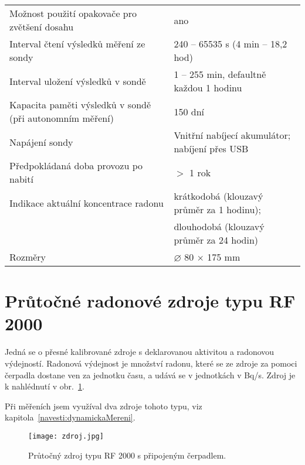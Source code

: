\begin{table}[H]
\begin{tabular}{p{}p{}}
Možnost použití opakovače pro zvětšení dosahu            & ano                                                                       \\
Interval čtení výsledků měření ze sondy                  & 240 – 65535 s (4 min – 18,2 hod)                                          \\
Interval uložení výsledků v sondě                        & 1 – 255 min, defaultně každou 1 hodinu                                    \\
Kapacita paměti výsledků v sondě (při autonomním měření) & 150 dní                                                                   \\
Napájení sondy                                           & Vnitřní nabíjecí akumulátor; nabíjení přes USB                            \\
Předpokládaná doba provozu po nabití                     & $>$ 1 rok                                                        \\
Indikace aktuální koncentrace radonu                     & krátkodobá (klouzavý průměr za 1 hodinu);                                  \\
                                                         & dlouhodobá (klouzavý průměr za 24 hodin)                                  \\
Rozměry                                                  & $\diameter$ 80 $\times$ 175 mm                                                   \\
\bottomrule
\end{tabular}
\end{table}
\section{Průtočné radonové zdroje typu RF 2000}\label{navesti:radon_zdroje}
Jedná se o přesné kalibrované zdroje s deklarovanou aktivitou  a radonovou výdejností. Radonová výdejnost je množství radonu, které se ze zdroje za pomoci čerpadla dostane ven za jednotku času, a udává se v jednotkách v \si{Bq/s}. Zdroj je k nahlédnutí v obr.~\ref{fig:radon_zdroj}.

Při měřeních jsem využíval dva zdroje tohoto typu, viz kapitola~\ref{navesti:dynamickaMereni}.
\begin{figure}[ht]
    \centering
    \texttt{[image: zdroj.jpg]}
    \caption{Průtočný zdroj typu RF 2000 s připojeným čerpadlem.}
    \label{fig:radon_zdroj}
\end{figure}
